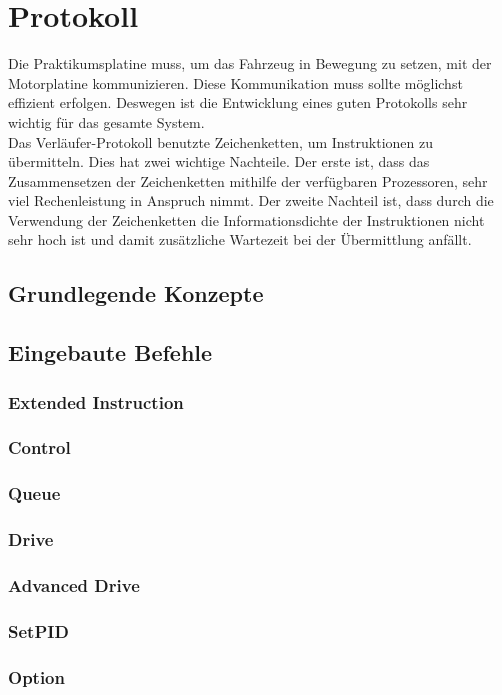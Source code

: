 \chapter{Protokoll}
Die Praktikumsplatine muss, um das Fahrzeug in Bewegung zu setzen, mit
der Motorplatine kommunizieren. Diese Kommunikation muss sollte möglichst
effizient erfolgen. Deswegen ist die Entwicklung eines guten Protokolls
sehr wichtig für das gesamte System.\\
Das Verläufer-Protokoll benutzte Zeichenketten, um Instruktionen zu übermitteln.
Dies hat zwei wichtige Nachteile. Der erste ist, dass das Zusammensetzen der
Zeichenketten mithilfe der verfügbaren Prozessoren, sehr viel Rechenleistung in
Anspruch nimmt. Der zweite Nachteil ist, dass durch die Verwendung der Zeichenketten
die Informationsdichte der Instruktionen nicht sehr hoch ist und damit zusätzliche
Wartezeit bei der Übermittlung anfällt.

\section{Grundlegende Konzepte}
\section{Eingebaute Befehle}
\subsection{Extended Instruction}
\subsection{Control}
\subsection{Queue}
\subsection{Drive}
\subsection{Advanced Drive}
\subsection{SetPID}
\subsection{Option}
